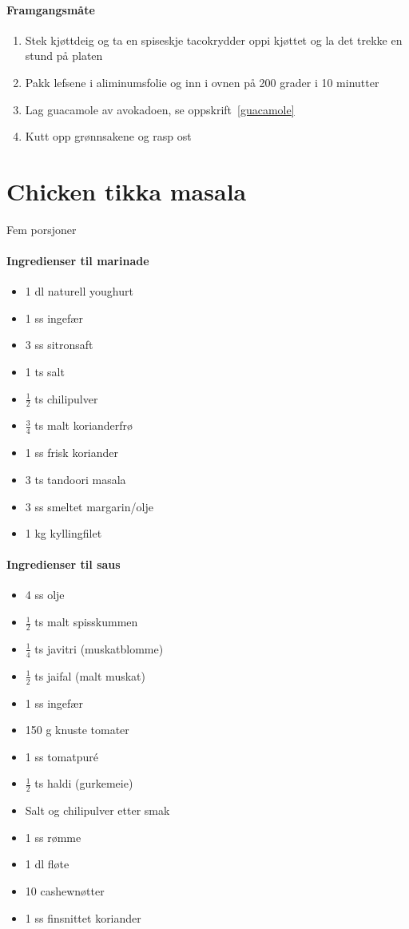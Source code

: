 \documentclass[12pt,a4paper]{book}
\begin{document}
\paragraph{Framgangsmåte}
\begin{enumerate}[noitemsep]
	\item Stek kjøttdeig og ta en spiseskje tacokrydder oppi kjøttet og la det trekke en stund på platen
	\item Pakk lefsene i aliminumsfolie og inn i ovnen på 200 grader i 10 minutter
	\item Lag guacamole av avokadoen, se oppskrift~\ref{guacamole}
	\item Kutt opp grønnsakene og rasp ost
\end{enumerate}
\clearpage{}
\clearpage{}\section{﻿Chicken tikka masala}
Fem porsjoner

\paragraph{Ingredienser til marinade}
\begin{itemize}[noitemsep]
	\item 1 dl naturell youghurt
	\item 1 ss ingefær
	\item 3 ss sitronsaft
	\item 1 ts salt
	\item $\frac{1}{2}$ ts chilipulver
	\item $\frac{3}{4}$ ts malt korianderfrø
	\item 1 ss frisk koriander
	\item 3 ts tandoori masala
	\item 3 ss smeltet margarin/olje
	\item 1 kg kyllingfilet
\end{itemize}

\paragraph{Ingredienser til saus}
\begin{itemize}[noitemsep]
	\item 4 ss olje
	\item  $\frac{1}{2}$ ts malt spisskummen
	\item $\frac{1}{4}$ ts javitri (muskatblomme)
	\item  $\frac{1}{2}$ ts jaifal (malt muskat)
	\item 1 ss ingefær
	\item 150 g knuste tomater
	\item 1 ss tomatpuré
	\item  $\frac{1}{2}$ ts haldi (gurkemeie)
	\item Salt og chilipulver etter smak
	\item 1 ss rømme
	\item 1 dl fløte
	\item 10 cashewnøtter
	\item 1 ss finsnittet koriander
\end{itemize}
\end{document}
